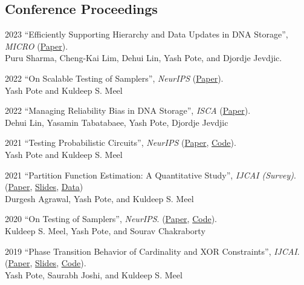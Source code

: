 \documentclass[12pt,letterpaper]{report}
\begin{document}
	
	\subsection*{Conference Proceedings}
	
	\begin{tablist}       
		
		\item[2023] \tab  \enquote{Efficiently Supporting Hierarchy and Data Updates in DNA Storage}, \textit{MICRO} (\href{https://arxiv.org/abs/2212.13447}{Paper}).\\
		Puru Sharma, Cheng-Kai Lim, Dehui Lin, Yash Pote, and Djordje Jevdjic.
		
		\item[2022] \tab  \enquote{On Scalable Testing of Samplers},  \textit{NeurIPS}  (\href{https://arxiv.org/abs/2306.13958}{Paper}).\\
		Yash Pote  and Kuldeep S. Meel
		
		\item[2022] \tab  \enquote{Managing Reliability Bias in DNA Storage}, \textit{ISCA}  (\href{https://arxiv.org/abs/2204.12261}{Paper}).\\
		Dehui Lin, Yasamin Tabatabaee, Yash Pote, Djordje Jevdjic
		
		\item[2021] \tab  \enquote{Testing Probabilistic Circuits},  \textit{NeurIPS}  (\href{https://arxiv.org/abs/2112.04941}{Paper}, \href{https://github.com/meelgroup/teq}{Code}).\\
		Yash Pote  and Kuldeep S. Meel
		
		\item[2021] \tab  \enquote{Partition Function Estimation: A Quantitative Study},  \textit{IJCAI (Survey)}.\\
		(\href{https://arxiv.org/abs/2105.11132}{Paper}, \href{https://meelgroup.github.io/publication/ijcai21_partition}{Slides}, \href{https://doi.org/10.5281/zenodo.4769117}{Data})\\
		Durgesh Agrawal, Yash Pote, and Kuldeep S. Meel
		
		\item[2020] \tab  \enquote{On Testing of Samplers}, \textit{NeurIPS}. (\href{https://arxiv.org/abs/2010.12918}{Paper}, \href{https://github.com/meelgroup/barbarik}{Code}).\\
		Kuldeep S. Meel, Yash Pote, and Sourav Chakraborty
		
		\item[2019] \tab \enquote{Phase Transition Behavior of Cardinality and
			XOR Constraints}, \textit{IJCAI}.\\ (\href{https://arxiv.org/abs/1910.09755}{Paper},  \href{https://meelgroup.github.io/files/slides/ijcai19pjm.pdf}{Slides},  \href{https://github.com/meelgroup/1-CARD-XOR/}{Code}).\\
		Yash Pote, Saurabh Joshi, and Kuldeep S. Meel
		
		
	\end{tablist}
	
\end{document}

